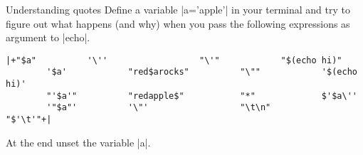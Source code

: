
\begin{exercise}[DodgerBlue]{Understanding quotes}
    Define a variable \bash|a='apple'| in your terminal and try to figure out what happens (and why) when you pass the following expressions as argument to \bash|echo|.
    \begin{lstlisting}[style=MyBash, moredelim={[is][\color{strings-color}]{|+}{+|}}]
        |+"$a"          '\''                  "\'"            "$(echo hi)"
        '$a'            "red$arocks"          "\""            '$(echo hi)'
        "'$a'"          "redapple$"           "*"             $'$a\''
        '"$a"'          '\"'                  "\t\n"          "$'\t'"+|
    \end{lstlisting}
    At the end unset the variable \bash|a|.
\end{exercise}
